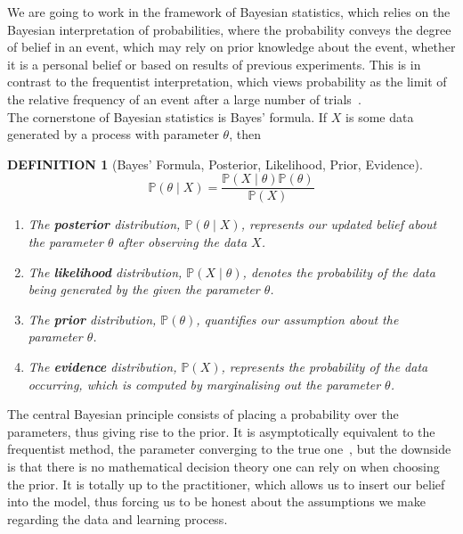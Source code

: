 \documentclass[12pt]{report}
\newtheorem{definition}[theorem]{DEFINITION}
\newcommand{\mb}[1]{\mathbb{#1}}
\begin{document}
We are going to work in the framework of Bayesian statistics, which relies on the Bayesian interpretation of probabilities, where the probability conveys the degree of belief in an event, which may rely on prior knowledge about the event, whether it is a personal belief or based on results of previous experiments. This is in contrast to the frequentist interpretation, which views probability as the limit of the relative frequency of an event after a large number of trials~\parencite{frequentist}. \\

The cornerstone of Bayesian statistics is Bayes' formula. If $X$ is some data generated by a process with parameter $\theta$, then

\begin{definition}[Bayes' Formula, Posterior, Likelihood, Prior, Evidence]
\label{eq:bayesdef}
\begin{equation*}
    \mb{P}(\theta \mid X) = \frac{\mb{P}(X \mid \theta)\mb{P}(\theta)}{\mb{P}(X)}
\end{equation*}
\begin{enumerate}
    \item The \textbf{posterior} distribution, $\mathbb{P}(\theta \mid X)$, represents our updated belief about the parameter $\theta$ after observing the data $X$.
    \item The \textbf{likelihood} distribution, $\mathbb{P}(X \mid \theta)$, denotes the probability of the data being generated by the given the parameter $\theta$.
    \item The \textbf{prior} distribution, $\mathbb{P}(\theta)$, quantifies our assumption about the parameter $\theta$.
    \item The \textbf{evidence} distribution, $\mathbb{P}(X)$, represents the probability of the data occurring, which is computed by marginalising out the parameter $\theta$.
\end{enumerate}
\end{definition}

The central Bayesian principle consists of placing a probability over the parameters, thus giving rise to the prior. It is asymptotically equivalent to the frequentist method, the parameter converging to the true one~\parencite{bayesconsistency}, but the downside is that there is no mathematical decision theory one can rely on when choosing the prior. It is totally up to the practitioner, which allows us to insert our belief into the model, thus forcing us to be honest about the assumptions we make regarding the data and learning process. \\
\end{document}

